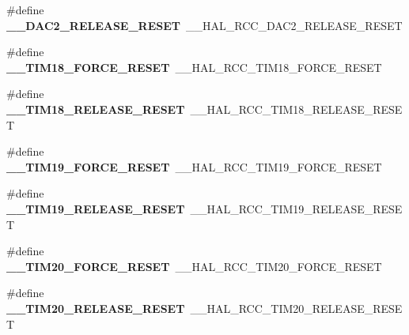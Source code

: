 \begin{DoxyCompactItemize}
\item 
\mbox{\label{group___h_a_l___r_c_c___aliased_ga2ca6c2de66e0242e9941d090e8e99ecd}} 
\#define {\bfseries \+\_\+\+\_\+\+D\+A\+C2\+\_\+\+R\+E\+L\+E\+A\+S\+E\+\_\+\+R\+E\+S\+ET}~\+\_\+\+\_\+\+H\+A\+L\+\_\+\+R\+C\+C\+\_\+\+D\+A\+C2\+\_\+\+R\+E\+L\+E\+A\+S\+E\+\_\+\+R\+E\+S\+ET
\item 
\mbox{\label{group___h_a_l___r_c_c___aliased_ga6b03e584a99a7145ffd9953327722870}} 
\#define {\bfseries \+\_\+\+\_\+\+T\+I\+M18\+\_\+\+F\+O\+R\+C\+E\+\_\+\+R\+E\+S\+ET}~\+\_\+\+\_\+\+H\+A\+L\+\_\+\+R\+C\+C\+\_\+\+T\+I\+M18\+\_\+\+F\+O\+R\+C\+E\+\_\+\+R\+E\+S\+ET
\item 
\mbox{\label{group___h_a_l___r_c_c___aliased_ga062debe81b59ed9a88bcf4258e09dbaf}} 
\#define {\bfseries \+\_\+\+\_\+\+T\+I\+M18\+\_\+\+R\+E\+L\+E\+A\+S\+E\+\_\+\+R\+E\+S\+ET}~\+\_\+\+\_\+\+H\+A\+L\+\_\+\+R\+C\+C\+\_\+\+T\+I\+M18\+\_\+\+R\+E\+L\+E\+A\+S\+E\+\_\+\+R\+E\+S\+ET
\item 
\mbox{\label{group___h_a_l___r_c_c___aliased_ga9e4eca7dac56bd682758cf5072f4e063}} 
\#define {\bfseries \+\_\+\+\_\+\+T\+I\+M19\+\_\+\+F\+O\+R\+C\+E\+\_\+\+R\+E\+S\+ET}~\+\_\+\+\_\+\+H\+A\+L\+\_\+\+R\+C\+C\+\_\+\+T\+I\+M19\+\_\+\+F\+O\+R\+C\+E\+\_\+\+R\+E\+S\+ET
\item 
\mbox{\label{group___h_a_l___r_c_c___aliased_ga16341f8a1420c4029215b0c89de8bda5}} 
\#define {\bfseries \+\_\+\+\_\+\+T\+I\+M19\+\_\+\+R\+E\+L\+E\+A\+S\+E\+\_\+\+R\+E\+S\+ET}~\+\_\+\+\_\+\+H\+A\+L\+\_\+\+R\+C\+C\+\_\+\+T\+I\+M19\+\_\+\+R\+E\+L\+E\+A\+S\+E\+\_\+\+R\+E\+S\+ET
\item 
\mbox{\label{group___h_a_l___r_c_c___aliased_gab06074cd313cdabefa42d60b6480abc1}} 
\#define {\bfseries \+\_\+\+\_\+\+T\+I\+M20\+\_\+\+F\+O\+R\+C\+E\+\_\+\+R\+E\+S\+ET}~\+\_\+\+\_\+\+H\+A\+L\+\_\+\+R\+C\+C\+\_\+\+T\+I\+M20\+\_\+\+F\+O\+R\+C\+E\+\_\+\+R\+E\+S\+ET
\item 
\mbox{\label{group___h_a_l___r_c_c___aliased_gabc15a945f5f92e4dff05caf959715131}} 
\#define {\bfseries \+\_\+\+\_\+\+T\+I\+M20\+\_\+\+R\+E\+L\+E\+A\+S\+E\+\_\+\+R\+E\+S\+ET}~\+\_\+\+\_\+\+H\+A\+L\+\_\+\+R\+C\+C\+\_\+\+T\+I\+M20\+\_\+\+R\+E\+L\+E\+A\+S\+E\+\_\+\+R\+E\+S\+ET

\end{DoxyCompactItemize}
